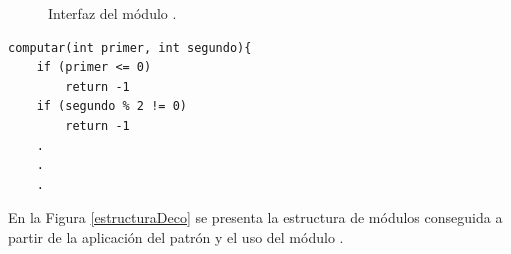 \begin{figure}[H]
\caption{Interfaz del módulo \Mecanismo.}
\label{mecanismo}
\begin{center}
\end{center}
\end{figure}

\begin{lstlisting}[caption=Verificación de precondiciones en método Computar.,label=verificacion]
computar(int primer, int segundo){
    if (primer <= 0)
        return -1
    if (segundo % 2 != 0)
        return -1
    .
    .
    .
\end{lstlisting}

En la Figura \ref{estructuraDeco} se presenta la estructura de módulos conseguida a partir de la aplicación del patrón y el uso del módulo \ErrorHandler.

